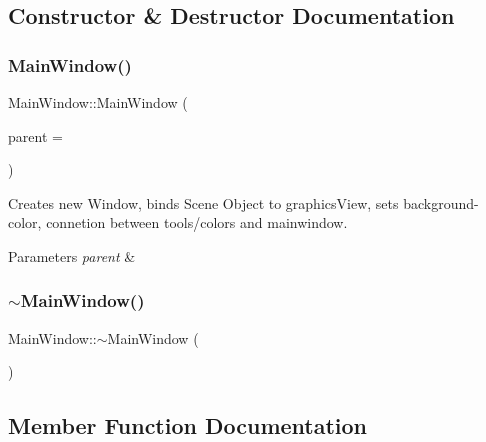 \subsection{Constructor \& Destructor Documentation}
\mbox{\label{class_main_window_a8b244be8b7b7db1b08de2a2acb9409db}} 
\subsubsection{\texorpdfstring{Main\+Window()}{MainWindow()}}
{\footnotesize\ttfamily Main\+Window\+::\+Main\+Window (\begin{DoxyParamCaption}\item[{Q\+Widget $\ast$}]{parent = {} }\end{DoxyParamCaption})\hspace{0.3cm}{\ttfamily [explicit]}}



Creates new Window, binds Scene Object to graphics\+View, sets background-\/color, connetion between tools/colors and mainwindow. 


\begin{DoxyParams}{Parameters}
{\em parent} & \\
\hline
\end{DoxyParams}
\mbox{\label{class_main_window_ae98d00a93bc118200eeef9f9bba1dba7}} 
\subsubsection{\texorpdfstring{$\sim$\+Main\+Window()}{~MainWindow()}}
{\footnotesize\ttfamily Main\+Window\+::$\sim$\+Main\+Window (\begin{DoxyParamCaption}{ }\end{DoxyParamCaption})}



\subsection{Member Function Documentation}
\mbox{\label{class_main_window_ac5cc69c34f6beb8f83484514c712fb7e}} 
